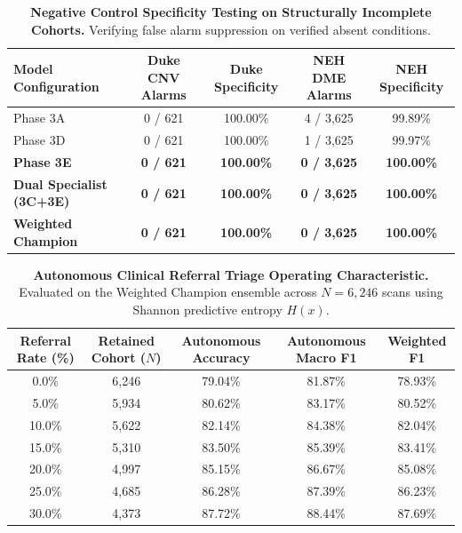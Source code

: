 \documentclass{article}
\begin{document}
\begin{table}[t]
\centering
\small
\caption{\textbf{Negative Control Specificity Testing on Structurally Incomplete Cohorts.} Verifying false alarm suppression on verified absent conditions.}
\label{tab:negative_control}
\begin{tabular}{lcccc}
\toprule
\textbf{Model Configuration} & \textbf{Duke CNV Alarms} & \textbf{Duke Specificity} & \textbf{NEH DME Alarms} & \textbf{NEH Specificity} \\
\midrule
Phase 3A & 0 / 621 & 100.00\% & 4 / 3,625 & 99.89\% \\
Phase 3D & 0 / 621 & 100.00\% & 1 / 3,625 & 99.97\% \\
\textbf{Phase 3E} & \textbf{0 / 621} & \textbf{100.00\%} & \textbf{0 / 3,625} & \textbf{100.00\%} \\
\textbf{Dual Specialist (3C+3E)} & \textbf{0 / 621} & \textbf{100.00\%} & \textbf{0 / 3,625} & \textbf{100.00\%} \\
\textbf{Weighted Champion} & \textbf{0 / 621} & \textbf{100.00\%} & \textbf{0 / 3,625} & \textbf{100.00\%} \\
\bottomrule
\end{tabular}
\end{table}

\begin{table}[t]
\centering
\small
\caption{\textbf{Autonomous Clinical Referral Triage Operating Characteristic.} Evaluated on the Weighted Champion ensemble across $N = 6,246$ scans using Shannon predictive entropy $H(x)$.}
\label{tab:referral_triage}
\begin{tabular}{ccccc}
\toprule
\textbf{Referral Rate (\%)} & \textbf{Retained Cohort ($N$)} & \textbf{Autonomous Accuracy} & \textbf{Autonomous Macro F1} & \textbf{Weighted F1} \\
\midrule
0.0\% & 6,246 & 79.04\% & 81.87\% & 78.93\% \\
5.0\% & 5,934 & 80.62\% & 83.17\% & 80.52\% \\
10.0\% & 5,622 & 82.14\% & 84.38\% & 82.04\% \\
15.0\% & 5,310 & 83.50\% & 85.39\% & 83.41\% \\
20.0\% & 4,997 & 85.15\% & 86.67\% & 85.08\% \\
25.0\% & 4,685 & 86.28\% & 87.39\% & 86.23\% \\
30.0\% & 4,373 & 87.72\% & 88.44\% & 87.69\% \\
\bottomrule
\end{tabular}
\end{table}
\end{document}

